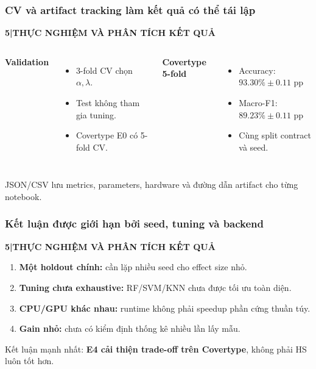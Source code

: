 \documentclass[aspectratio=169,12pt]{beamer}
\newcommand{\chaptertag}[2]{%
  \vspace{-0.16cm}%
  {\scriptsize\bfseries\textcolor{boxframe}{#1\enspace |\enspace #2}}\par
  \vspace{0.12cm}%
}
\begin{document}
\begin{frame}
  \frametitle{CV và artifact tracking làm kết quả có thể tái lập}
  \chaptertag{5}{THỰC NGHIỆM VÀ PHÂN TÍCH KẾT QUẢ}
  \begin{columns}[T,onlytextwidth]
      \textbf{Validation}
      \begin{itemize}
        \item 3-fold CV chọn $\alpha,\lambda$.
        \item Test không tham gia tuning.
        \item Covertype E0 có 5-fold CV.
      \end{itemize}
      \textbf{Covertype 5-fold}
      \begin{itemize}
        \item Accuracy: $93.30\%\pm0.11$ pp
        \item Macro-F1: $89.23\%\pm0.11$ pp
        \item Cùng split contract và seed.
      \end{itemize}
  \end{columns}
  \vspace{0.28cm}
  \centering
  JSON/CSV lưu metrics, parameters, hardware và đường dẫn artifact cho từng notebook.
\end{frame}

\begin{frame}
  \frametitle{Kết luận được giới hạn bởi seed, tuning và backend}
  \chaptertag{5}{THỰC NGHIỆM VÀ PHÂN TÍCH KẾT QUẢ}
  \begin{enumerate}
    \item \textbf{Một holdout chính:} cần lặp nhiều seed cho effect size nhỏ.
    \item \textbf{Tuning chưa exhaustive:} RF/SVM/KNN chưa được tối ưu toàn diện.
    \item \textbf{CPU/GPU khác nhau:} runtime không phải speedup phần cứng thuần túy.
    \item \textbf{Gain nhỏ:} chưa có kiểm định thống kê nhiều lần lấy mẫu.
  \end{enumerate}
  \vspace{0.28cm}
  \begin{tcolorbox}[focusbox,width=0.91\textwidth,top=2mm,bottom=2mm]
    \centering
    Kết luận mạnh nhất: \textbf{E4 cải thiện trade-off trên Covertype}, không phải HS luôn tốt hơn.
  \end{tcolorbox}
\end{frame}
\end{document}
